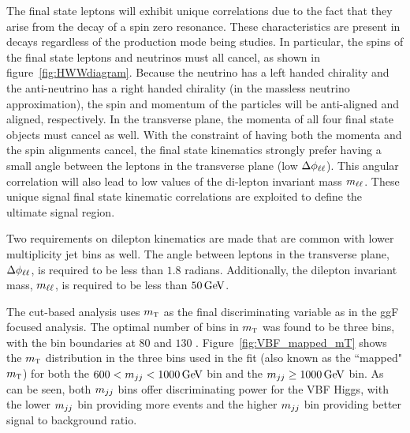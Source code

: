 The final state leptons will exhibit unique correlations due to the fact that they arise from the decay of a spin zero resonance. These characteristics are present in \HWWfull decays regardless of the production mode being studies. In particular, the spins of the final state leptons and neutrinos must all cancel, as shown in figure~\ref{fig:HWWdiagram}. Because the neutrino has a left handed
chirality and the anti-neutrino has a right handed chirality (in the massless neutrino approximation), the spin and momentum of the particles will be anti-aligned and aligned, respectively. In the transverse plane, the momenta of all four final state objects must cancel as well. With the constraint of having both the momenta and the spin alignments cancel, the final state kinematics strongly prefer having a small angle between the leptons in the transverse plane (low $\Delta\phi_{\ell\ell}$). This angular correlation will also lead to low values of the di-lepton invariant mass $m_{\ell\ell}$. These unique signal final state kinematic correlations are exploited to define the ultimate signal region. 

Two requirements on dilepton kinematics are made that are common with lower multiplicity jet bins as well. The angle between leptons in the transverse plane, $\Delta\phi_{\ell\ell}$, is required to be less than $1.8$ radians. Additionally, the dilepton invariant mass, $m_{\ell\ell}$, is required to be less than $50 \GeV$. 

The cut-based analysis uses $m_{\textrm{\footnotesize\sc t}}$ as the final discriminating variable as in the ggF focused analysis. The optimal number of bins in $m_{\textrm{\footnotesize\sc t}}$ was found to be three bins, with the bin boundaries at $80$ and $130$ \GeV. Figure~\ref{fig:VBF_mapped_mT} shows the $m_{\textrm{\footnotesize\sc t}}$ distribution in the three bins used in the fit (also known as the ``mapped" $m_{\textrm{\footnotesize\sc t}}$) for both the $600 < \mjj < 1000 \GeV$ bin and the $\mjj \geq 1000 \GeV$ bin. As can be seen, both $m_{jj}$ bins offer discriminating power for the VBF Higgs, with the lower $m_{jj}$ bin providing more events and the higher $m_{jj}$ bin providing better signal to background ratio. 

